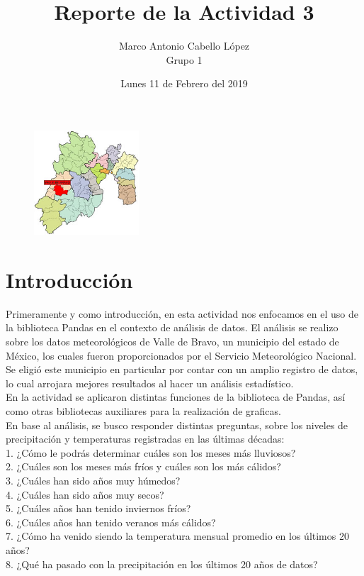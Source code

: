 \documentclass[12pt]{article}
\title{Reporte de la Actividad 3}
\author{Marco Antonio Cabello López \\ Grupo 1}
\date{Lunes 11 de Febrero del 2019}
\begin{document}
\maketitle 
\begin{figure}
    \centering
    \includegraphics[width=0.35\textwidth]{valle.jpg}
\end{figure}
\section{Introducción}
Primeramente y como introducción, en esta actividad nos enfocamos en el uso de la biblioteca Pandas en el contexto de análisis de datos. El análisis se realizo sobre los datos meteorológicos de Valle de Bravo, un municipio del estado de México, los cuales fueron proporcionados por el Servicio Meteorológico Nacional. \\
Se eligió este municipio en particular por contar con un amplio registro de datos, lo cual arrojara mejores resultados al hacer un análisis estadístico. \\
En la actividad se aplicaron distintas funciones de la biblioteca de Pandas, así como otras bibliotecas auxiliares para la realización de graficas. \\
En base al análisis, se busco responder distintas preguntas, sobre los niveles de precipitación y temperaturas registradas en las últimas décadas: \\
1. ¿Cómo le podrás determinar cuáles son los meses más lluviosos? \\
2. ¿Cuáles son los meses más fríos y cuáles son los más cálidos? \\
3. ¿Cuáles han sido años muy húmedos? \\
4. ¿Cuáles han sido años muy secos? \\
5. ¿Cuáles años han tenido inviernos fríos? \\
6. ¿Cuáles años han tenido veranos más cálidos? \\
7. ¿Cómo ha venido siendo la temperatura mensual promedio en los últimos 20 años? \\
8. ¿Qué ha pasado con la precipitación en los últimos 20 años de datos? 
\end{document}
